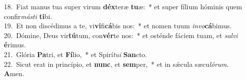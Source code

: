 {18.~}Fiat manus tua super virum \textbf{déx}teræ \textbf{tu}æ:~* et super fílium hóminis quem confir\textit{má}\textit{sti} \textbf{ti}bi.\\
{19.~}Et non discédimus a te, vi\textbf{vi}fi\textbf{cá}bis nos:~* et nomen tuum \textit{in}\textit{vo}\textbf{cá}bimus.\\
{20.~}Dómine, Deus vir\textbf{tú}tum, con\textbf{vér}te nos:~* et osténde fáciem tuam, et \textit{sal}\textit{vi} \textbf{é}rimus.\\
{21.~}Glória \textbf{Pa}tri, et \textbf{Fí}lio,~* et Spirí\textit{tu}\textit{i} \textbf{San}cto.\\
{22.~}Sicut erat in princípio, et \textbf{nunc}, et \textbf{sem}per,~* et in sǽcula sæcu\textit{ló}\textit{rum}. \textbf{A}men.\\
